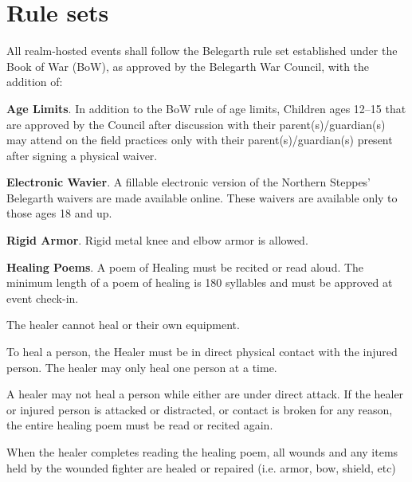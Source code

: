\documentclass[12pt]{article}
\begin{document}
\section{Rule sets}
\begin{level}
    \item All realm-hosted events shall follow the Belegarth rule set established under the Book of War (BoW), as approved by the Belegarth War Council, with the addition of:
    \begin{level}
        \item \textbf{Age Limits}. In addition to the BoW rule of age limits, Children ages 12--15 that are approved by the Council after discussion with their parent(s)/guardian(s) may attend on the field practices only with their parent(s)/guardian(s) present after signing a physical waiver.
        \item \textbf{Electronic Wavier}. A fillable electronic version of the Northern Steppes' Belegarth waivers are made available online. These waivers are available only to those ages 18 and up.
        \item \textbf{Rigid Armor}. Rigid metal knee and elbow armor is allowed.
        \item \textbf{Healing Poems}. A poem of Healing must be recited or read aloud. The minimum length of a poem of healing is 180 syllables and must be approved at event check-in.
        \begin{level}
            \item The healer cannot heal  or their own equipment.
            \item To heal a person, the Healer must be in direct physical contact with the injured person. The healer may only heal one person at a time.
            \item A healer may not heal a person while either are under direct attack. If the healer or injured person is attacked or distracted, or contact is broken for any reason, the entire healing poem must be read or recited again.
            \item When the healer completes reading the healing poem, all wounds and any items held by the wounded fighter are healed or repaired (i.e. armor, bow, shield, etc)
        \end{level}
    \end{level}
\end{level}
\end{document}
